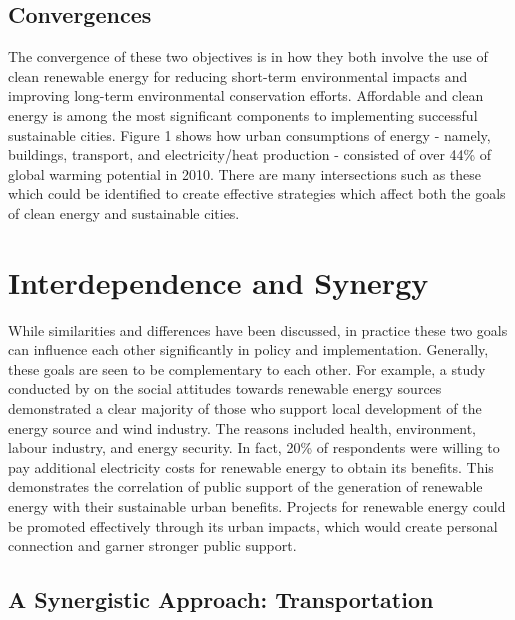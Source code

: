 \documentclass[10pt, oneside, letterpaper]{article}
\begin{document}
\begin{multicols}{2}
	\subsection{Convergences}
	
	The convergence of these two objectives is in how they both involve the use of clean renewable energy for reducing short-term environmental impacts and improving long-term environmental conservation efforts. Affordable and clean energy is among the most significant components to implementing successful sustainable cities. Figure 1 shows how urban consumptions of energy - namely, buildings, transport, and electricity/heat production - consisted of over 44\% of global warming potential in 2010. There are many intersections such as these which could be identified to create effective strategies which affect both the goals of clean energy and sustainable cities.
	
	\section{Interdependence and Synergy}
	
	While similarities and differences have been discussed, in practice these two goals can influence each other significantly in policy and implementation. Generally, these goals are seen to be complementary to each other. For example, a study conducted by  on the social attitudes towards renewable energy sources demonstrated a clear majority of those who support local development of the energy source and wind industry. The reasons included health, environment, labour industry, and energy security. In fact, 20\% of respondents were willing to pay additional electricity costs for renewable energy to obtain its benefits. This demonstrates the correlation of public support of the generation of renewable energy with their sustainable urban benefits. Projects for renewable energy could be promoted effectively through its urban impacts, which would create personal connection and garner stronger public support.
	
	\subsection{A Synergistic Approach: Transportation}
	

\end{multicols}
\end{document}
